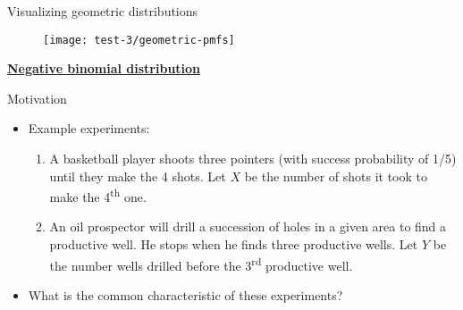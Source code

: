 \documentclass{article}
\newcommand{\bu}[1]{\textbf{\ul{#1}}}				%
\begin{document}
Visualizing geometric distributions\bigskip

\begin{figure}[H]
    \center\texttt{[image: test-3/geometric-pmfs]}
\end{figure}

\newpage

\bu{Negative binomial distribution}\bigskip

Motivation\bigskip
\begin{itemize}
    \item Example experiments:
    \begin{enumerate}
        \item A basketball player shoots three pointers (with success probability of 1/5) until they make the 4 shots. Let $X$ be the number of shots it took to make the 4\textsuperscript{th} one.
        \item An oil prospector will drill a succession of holes in a given area to find a productive well. He stops when he finds three productive wells. Let $Y$ be the number wells drilled before the 3\textsuperscript{rd} productive well.
    \end{enumerate}
    \item What is the common characteristic of these experiments?\bigskip
\end{itemize}\bigskip
\end{document}
